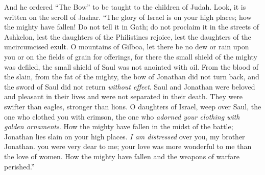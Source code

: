 \begin{biblechapter}
\verse And he ordered “The Bow” to be taught to the children of Judah. Look, it is written on the scroll of Jashar.
\verse “The glory of Israel is on your high places; how the mighty have fallen!
\verse Do not tell it in Gath; do not proclaim it in the streets of Ashkelon, 
lest the daughters of the Philistines rejoice, 
lest the daughters of the uncircumcised exult.
\verse O mountains of Gilboa, let there be no dew or rain upon you 
or on the fields of grain for offerings, 
for there the small shield of the mighty was defiled, 
the small shield of Saul was not anointed with oil.
\verse From the blood of the slain, from the fat of the mighty, 
the bow of Jonathan did not turn back, 
and the sword of Saul did not return \textit{without effect}.
\verse Saul and Jonathan were beloved and pleasant in their lives 
and were not separated in their death. 
They were swifter than eagles, stronger than lions.
\verse O daughters of Israel, weep over Saul, 
the one who clothed you with crimson, 
the one who \textit{adorned your clothing with golden ornaments}.
\verse How the mighty have fallen in the midst of the battle; 
Jonathan lies slain on your high places.
\verse \textit{I am distressed} over you, my brother Jonathan. 
you were very dear to me; 
your love was more wonderful to me than the love of women.
\verse How the mighty have fallen and the weapons of warfare perished.”
\end{biblechapter}

